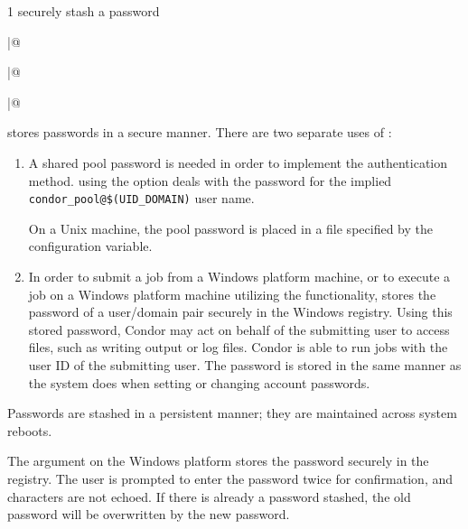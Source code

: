 \begin{ManPage}{\label{man-condor-store-cred}}{1}
{securely stash a password}
\Synopsis
{}

\Lbr
{} \verb@|@ 
\Rbr 
{}

\Lbr
{} \verb@|@ 
\Rbr 
{}

\Lbr
{} \verb@|@ 
\Rbr 
{}


\Description 

 stores passwords in a secure manner.
There are two separate uses of :
\begin{enumerate}
\item A shared pool password is needed in order to implement the 
 authentication method.
 using the  option deals with the
password for the implied \verb|condor_pool@$(UID_DOMAIN)| user name.

On a Unix machine, the pool password is
placed in a file specified by the 
configuration variable.

\item In order to submit a job from a Windows platform machine,
or to execute a job on a Windows platform machine utilizing the
 functionality, 
 stores the password
of a user/domain pair securely in the Windows registry.
Using this stored password, 
Condor may act on behalf of the submitting user to access files,
such as writing output or log files. 
Condor is able to
run jobs with the user ID of the submitting user.
The password is stored in the same manner as the system does when
setting or changing account passwords.
\end{enumerate}

Passwords are stashed in a persistent manner; they are maintained
across system reboots.

The  argument on the Windows platform 
stores the password securely in the registry.
The user is prompted to enter the password twice for confirmation, 
and characters are not echoed.
If there is already a password stashed,
the old password will be overwritten by the new password.


\end{ManPage}
